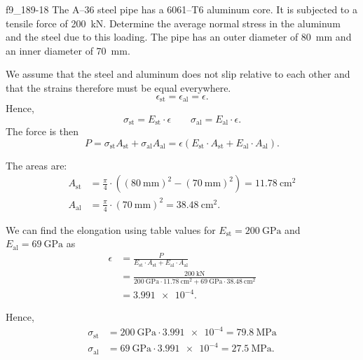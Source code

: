 
\begin{problemwithimage}{f9_18}{9-18}
  The A--36 steel pipe has a 6061--T6 aluminum core.
  It is subjected to a tensile force of \qty{200}{\kN}.
  Determine the average normal stress in the aluminum and the steel due to this loading.
  The pipe has an outer diameter of \qty{80}{\mm} and an inner diameter of \qty{70}{\mm}.
\end{problemwithimage}

\begin{derivation}
  We assume that the steel and aluminum does not slip relative to each other and that the strains therefore must be equal everywhere.
  \begin{equation*}
    \epsilon_{\mathrm{st}} = \epsilon_{\mathrm{al}} = \epsilon
  .\end{equation*}
  Hence,
  \begin{equation*}
    \sigma_{\mathrm{st}} = E_{\mathrm{st}} \cdot \epsilon \qquad \sigma_{\mathrm{al}} = E_{\mathrm{al}} \cdot \epsilon
  .\end{equation*}
  The force is then
  \begin{equation*}
    P = \sigma_{\mathrm{st}} A_{\mathrm{st}} + \sigma_{\mathrm{al}} A_{\mathrm{al}} = \epsilon \left( E_{\mathrm{st}} \cdot A_{\mathrm{st}} + E_{\mathrm{al}} \cdot A_{\mathrm{al}} \right)
  .\end{equation*}

  The areas are:
  \begin{align*}
    A_{\mathrm{st}} &= \frac{\pi}{4}\cdot \left( \left( \qty{80}{\mm}  \right)^2 - \left( \qty{70}{\mm}  \right)^2 \right)  = \qty{11.78}{\cm^2}\\
    A_{\mathrm{al}} &= \frac{\pi}{4} \cdot \left( \qty{70}{\mm}  \right)^2  = \qty{38.48}{\cm^2}
  .\end{align*}
  
  We can find the elongation using table values for $E_{\mathrm{st}} = \qty{200}{\GPa}$ and $E_{\mathrm{al}} = \qty{69}{\GPa}$ as
  \begin{align*}
    \epsilon &= \frac{P}{E_{\mathrm{st}}\cdot A_{\mathrm{st}} + E_{\mathrm{al}}\cdot A_{\mathrm{al}}} \\
    &= \frac{\qty{200}{\kN}}{\qty{200}{\GPa} \cdot \qty{11.78}{\cm^2} + \qty{69}{\GPa} \cdot \qty{38.48}{\cm^2} } \\
    &= \num{3,991e-4}
  .\end{align*}

  Hence,
  \begin{align*}
    \sigma_{\mathrm{st}} &= \qty{200}{\GPa} \cdot \num{3.991e-4} = \qty{79.8}{\MPa} \\
    \sigma_{\mathrm{al}} &= \qty{69}{\GPa} \cdot \num{3.991e-4} = \qty{27.5}{\MPa} 
  .\end{align*}
\end{derivation}

